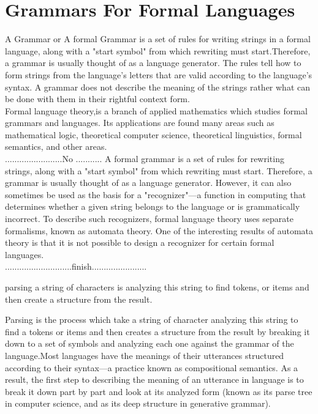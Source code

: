 
\section{Grammars For Formal Languages}

A Grammar or A formal Grammar is a set of rules for writing strings in a formal language, along with a "start symbol" from which rewriting must start.Therefore, a grammar is usually thought of as a language generator. The rules tell how to form strings from the language's letters that are valid according to the language's syntax. A grammar does not describe the meaning of the strings rather  what can be done with them in their rightful context form.\\


Formal language theory,is a branch of applied mathematics which studies formal grammars and languages. Its applications are found many areas such as mathematical logic, theoretical computer science, theoretical linguistics, formal semantics,  and other areas.\\

........................No ...........
A formal grammar is a set of rules for rewriting strings, along with a "start symbol" from which rewriting must start. Therefore, a grammar is usually thought of as a language generator. However, it can also sometimes be used as the basis for a "recognizer"—a function in computing that determines whether a given string belongs to the language or is grammatically incorrect. To describe such recognizers, formal language theory uses separate formalisms, known as automata theory. One of the interesting results of automata theory is that it is not possible to design a recognizer for certain formal languages.\\
............................finish.......................

parsing a string of characters is analyzing this string to find tokens, or items and then create a structure from the result.

Parsing is the process which take a string of  character analyzing this string to find a tokens or items and then creates a structure from the result by breaking it down to a set of symbols and analyzing each one against the grammar of the language.Most languages have the meanings of their utterances structured according to their syntax—a practice known as compositional semantics. As a result, the first step to describing the meaning of an utterance in language is to break it down part by part and look at its analyzed form (known as its parse tree in computer science, and as its deep structure in generative grammar).

